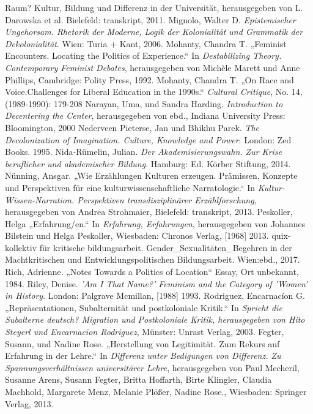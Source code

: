 \begin{thebibliography}{100}
{Raum? Kultur, Bildung und Differenz in der Universität}, herausgegeben von L. Darowska et al. Bielefeld: transkript, 2011. 
 Mignolo, Walter D. \emph{Epistemischer Ungehorsam. Rhetorik
der Moderne, Logik der Kolonialität und Grammatik der Dekolonialität}. Wien: Turia + Kant, 2006.
 Mohanty, Chandra T. „Feminist Encounters. Locating the
Politics of Experience.“ In \emph{Destabilizing
Theory. Contemporary Feminist Debates}, herausgegeben von Michèle Marett und Anne Phillips, Cambridge: Polity Press, 1992. 
 Mohanty, Chandra T. „On Race and Voice.Challenges for Liberal
Education in the 1990s.“ \emph{Cultural Critique}, No. 14, (1989-1990): 179-208
 Narayan, Uma, und Sandra  Harding. \emph{Introduction to
Decentering the Center}, herausgegeben von ebd., Indiana University Press: Bloomington, 2000
 Nederveen Pieterse, Jan und Bhikhu Parek. \emph{The Decolonization of Imagination. Culture,
Knowledge and Power}. London:  Zed Books. 1995.
 Nida-Rümelin, Julian. \emph{Der Akademisierungswahn. Zur Krise beruflicher und akademischer Bildung}. Hamburg: Ed. Körber Stiftung, 2014.
 Nünning, Ansgar. „Wie Erzählungen Kulturen erzeugen. Prämissen, Konzepte und Perspektiven für
eine kulturwissenschaftliche Narratologie.“ In \emph{Kultur-Wissen-Narration.
Perspektiven transdisziplinärer Erzählforschung}, herausgegeben von Andrea Strohmaier,  Bielefeld: transkript, 2013.
 Peskoller, Helga „Erfahrung/en.“  In \emph{Erfahrung,
Erfahrungen}, herausgegeben von  Johannes Bilstein und Helga Peskoller, Wiesbaden: Chronos Verlag, [1968] 2013.
 quix-kollektiv für kritische bildungsarbeit. Gender\_Sexualitäten\_Begehren in der Machtkritischen und Entwicklungspolitischen Bildungsarbeit. Wien:ebd., 2017.
 Rich, Adrienne. „Notes Towards a Politics of Location“ Essay, Ort unbekannt, 1984.
 Riley, Denise. \emph{'Am I That Name?' Feminism and the Category of 'Women' in History}. London: Palgrave Mcmillan, [1988] 1993.
 Rodriguez, Encarnacíon G. „Repräsentationen, Subalternität
und postkoloniale Kritik.“ In \emph{Spricht die Subalterne deutsch? Migration
  und Postkoloniale Kritik, herausgegeben von Hito Steyerl und Encarnacion
Rodriguez}, Münster: Unrast Verlag, 2003.
 Fegter, Susann, und Nadine Rose. „Herstellung von Legitimität. Zum Rekurs auf Erfahrung in der 
Lehre.“ In \emph{Differenz unter Bedigungen von Differenz. Zu Spannungsverhältnissen universitärer Lehre}, 
herausgegeben von Paul Mecheril, Susanne Arens, Susann Fegter, Britta Hoffarth, Birte Klingler, Claudia Machhold, Margarete Menz, Melanie Plößer, Nadine Rose., Wiesbaden: Springer Verlag, 2013. 

\end{thebibliography}

